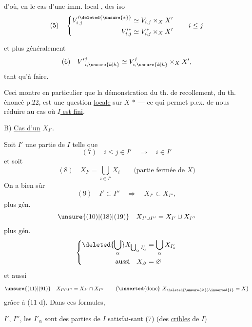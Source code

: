 d'où, en le cas d'une imm. local ,
des iso
\[
(5)\quad\left\{\begin{aligned}
V'^{\deleted{\unsure{*}}}_{i,j}&\simeq V_{i,j}\times_X X'\\
V'^{*}_{i,j}&\simeq V^*_{i,j}\times_X X'
\end{aligned}\right.\qquad i\leq j
\]


et plus généralement
\[
(6)\quad V'{}^{j}_{i,\unsure{k|h}}\simeq V^{j}_{i,\unsure{k|h}}\times_X X',
\]
tant qu'à faire.

Ceci montre en particulier que la démonstration du th. de recollement, du th. énoncé p.22, est une question \uline{locale} sur $X$ \textcircled{$*$} --- ce qui permet p.ex. de nous réduire au cas où  \uline{$I$ est fini}.



B) \uline{Cas d'un} $X_{I'}$. 

Soit $I'$ une partie de $I$ telle que
\[
(7)\quad i\leq j\in I'\quad\Longrightarrow\quad i\in I'
\]
et soit
\[
(8)\quad X_{I'}=\bigcup_{i\in I'}X_i\qquad\text{(partie fermée de $X$)}
\]
On a bien sûr
\[
(9)\quad I'\subset I''\quad\Longrightarrow\quad X_{I'}\subset X_{I''},
\]
plus gén\textsuperscript{}.
\[
\unsure{(10)|(18)|(19)}\quad X_{I'\cup I''}=X_{I'}\cup X_{I''}
\]
plus gén.
\[
\left\{\begin{aligned}
\deleted{\bigcup_\alpha}X_{\bigcup_\alpha I'_\alpha}&=\bigcup_\alpha X_{I'_\alpha}\\
\text{aussi}\quad X_{\varnothing}&=\varnothing
\end{aligned}\right.
\]
 et aussi
\[
\unsure{(11)|(91)}\quad X_{I'\cap I''}=X_{I'}\cap X_{I''}\qquad
\left(\text{\inserted{donc} }X_{\deleted{\unsure{\varnothing}}\inserted{I}}=X\right)
\]
grâce à (11 d). Dans ces formules,


$I'$, $I''$, les $I'_\alpha$ sont des parties de $I$ satisfai-\linebreak sant (7) (des \uline{cribles} de $I$)

